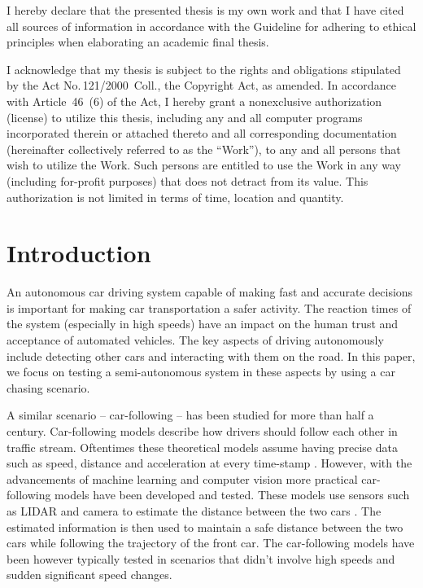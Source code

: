 \begin{declaration}
		I hereby declare that the presented thesis is my own work and that I have cited all sources of information in accordance with the Guideline for adhering to ethical principles when elaborating an academic final thesis.
		
		I acknowledge that my thesis is subject to the rights and obligations stipulated by the Act No.\,121/2000~Coll., the Copyright Act, as amended. In accordance with Article~46~(6) of the Act, I hereby grant a nonexclusive authorization (license) to utilize this thesis, including any and all computer programs incorporated therein or attached thereto and all corresponding documentation (hereinafter collectively referred to as the ``Work''), to any and all persons that wish to utilize the Work. Such persons are entitled to use the Work in any way (including for-profit purposes) that does not detract from its value. This authorization is not limited in terms of time, location and quantity.
\end{declaration}





\maketitle

\chapter{Introduction}
An autonomous car driving system capable of making fast and accurate decisions is important for making car transportation a safer activity. The reaction times of the system (especially in high speeds) have an impact on the human trust and acceptance of automated vehicles. The key aspects of driving autonomously include detecting other cars and interacting with them on the road. In this paper, we focus on testing a semi-autonomous system in these aspects by using a car chasing scenario. \par

A similar scenario -- car-following -- has been studied for more than half a century. Car-following models describe how drivers should follow each other in traffic stream. Oftentimes these theoretical models assume having precise data such as speed, distance and acceleration at every time-stamp \cite{car_following}. However, with the advancements of machine learning and computer vision more practical car-following models have been developed and tested. These models use sensors such as LIDAR and camera to estimate the distance between the two cars \cite{lidar_highway}. The estimated information is then used to maintain a safe distance between the two cars while following the trajectory of the front car. The car-following models have been however typically tested in scenarios that didn't involve high speeds and sudden significant speed changes. \par
 
